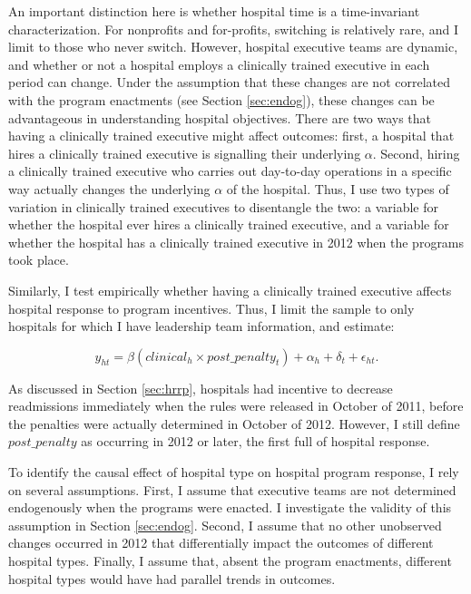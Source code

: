 \documentclass[12pt]{article}
\begin{document}
    An important distinction here is whether hospital time is a time-invariant characterization. For nonprofits and for-profits, switching is relatively rare, and I limit to those who never switch. However, hospital executive teams are dynamic, and whether or not a hospital employs a clinically trained executive in each period can change. Under the assumption that these changes are not correlated with the program enactments (see Section \ref{sec:endog}), these changes can be advantageous in understanding hospital objectives. There are two ways that having a clinically trained executive might affect outcomes: first, a hospital that hires a clinically trained executive is signalling their underlying $\alpha$. Second, hiring a clinically trained executive who carries out day-to-day operations in a specific way actually changes the underlying $\alpha$ of the hospital. Thus, I use two types of variation in clinically trained executives to disentangle the two: a variable for whether the hospital ever hires a clinically trained executive, and a variable for whether the hospital has a clinically trained executive in 2012 when the programs took place.  
    
    Similarly, I test empirically whether having a clinically trained executive affects hospital response to program incentives. Thus, I limit the sample to only hospitals for which I have leadership team information, and estimate:

    \begin{equation}
    \label{eq:clinical}
    y_{ht} = \beta (clinical_h \times post\_penalty_t) + \alpha_{h} + \delta_t + \epsilon_{ht}.
    \end{equation}
    
    As discussed in Section \ref{sec:hrrp}, hospitals had incentive to decrease readmissions immediately when the rules were released in October of 2011, before the penalties were actually determined in October of 2012. However, I still define $post\_penalty$ as occurring in 2012 or later, the first full of hospital response.

    To identify the causal effect of hospital type on hospital program response, I rely on several assumptions. First, I assume that executive teams are not determined endogenously when the programs were enacted. I investigate the validity of this assumption in Section \ref{sec:endog}. Second, I assume that no other unobserved changes occurred in 2012 that differentially impact the outcomes of different hospital types. Finally, I assume that, absent the program enactments, different hospital types would have had parallel trends in outcomes. 
\end{document}
